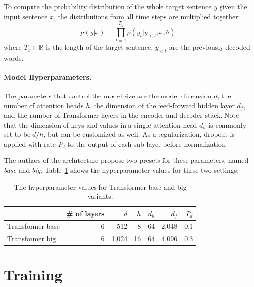 To compute the probability distribution of the whole target sentence $y$ given
the input sentence $x$, the distributions from all time steps are multiplied
together:
%
\begin{equation}
  p(y|x) = \prod_{t=1}^{T_y}p(y_t|y_{<t},x,\theta)
  \label{eq:output-distribution}
\end{equation}
%
where $T_y \in \mathbb{R}$ is the length of the target sentence, $y_{<t}$ are
the previously decoded words.

\paragraph{Model Hyperparameters.} The parameters that control the model size
are the model dimension $d$, the number of attention heads $h$, the dimension
of the feed-forward hidden layer $d_f$, and the number of Transformer layers in
the encoder and decoder stack. Note that the dimension of keys and values in a
single attention head $d_h$ is commonly set to be $d / h$, but can be
customized as well.  As a regularization, dropout \citep{srivastava2014dropout}
is applied with rate $P_d$ to the output of each sub-layer before
normalization.

The authors of the architecture propose two presets for these parameters, named
\emph{base} and \emph{big}. Table~\ref{tab:transformer-hyperparams} shows the
hyperparameter values for these two settings.

\begin{table}
  \centering
  \begin{tabular}{lrrrrrr}
    \toprule
      & \# of layers &  $d$  &  $h$  & $d_h$ & $d_f$ & $P_d$ \\
    \midrule
    Transformer base  & 6 &  512  & 8 & 64 &  2,048 & 0.1 \\
    Transformer big  & 6 &  1,024  & 16 & 64 &  4,096 & 0.3 \\
    \bottomrule
  \end{tabular}
  \caption{The hyperparameter values for Transformer base and big variants.}%
  \label{tab:transformer-hyperparams}
\end{table}


\section{Training}
\label{sec:training}


